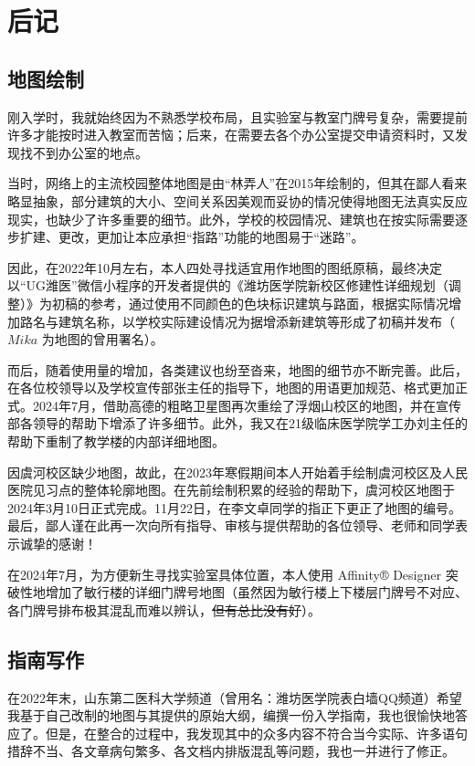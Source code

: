 \chapter[后记]{后记}
\section[地图绘制]{地图绘制}
刚入学时，我就始终因为不熟悉学校布局，且实验室与教室门牌号复杂，需要提前许多才能按时进入教室而苦恼；后来，在需要去各个办公室提交申请资料时，又发现找不到办公室的地点。

当时，网络上的主流校园整体地图是由“林弄人”在2015年绘制的，但其在鄙人看来略显抽象，部分建筑的大小、空间关系因美观而妥协的情况使得地图无法真实反应现实，也缺少了许多重要的细节。此外，学校的校园情况、建筑也在按实际需要逐步扩建、更改，更加让本应承担“指路”功能的地图易于“迷路”。

因此，在2022年10月左右，本人四处寻找适宜用作地图的图纸原稿，最终决定以“UG潍医”微信小程序的开发者提供的《潍坊医学院新校区修建性详细规划（调整）》为初稿的参考，通过使用不同颜色的色块标识建筑与路面，根据实际情况增加路名与建筑名称，以学校实际建设情况为据增添新建筑等形成了初稿并发布（$Mika$ 为地图的曾用署名）。

而后，随着使用量的增加，各类建议也纷至沓来，地图的细节亦不断完善。此后，在各位校领导以及学校宣传部张主任的指导下，地图的用语更加规范、格式更加正式。2024年7月，借助高德的粗略卫星图再次重绘了浮烟山校区的地图，并在宣传部各领导的帮助下增添了许多细节。此外，我又在21级临床医学院学工办刘主任的帮助下重制了教学楼的内部详细地图。

因虞河校区缺少地图，故此，在2023年寒假期间本人开始着手绘制虞河校区及人民医院见习点的整体轮廓地图。在先前绘制积累的经验的帮助下，虞河校区地图于2024年3月10日正式完成。11月22日，在李文卓同学的指正下更正了地图的编号。最后，鄙人谨在此再一次向所有指导、审核与提供帮助的各位领导、老师和同学表示诚挚的感谢！

在2024年7月，为方便新生寻找实验室具体位置，本人使用 Affinity® Designer 突破性地增加了敏行楼的详细门牌号地图（虽然因为敏行楼上下楼层门牌号不对应、各门牌号排布极其混乱而难以辨认，\st{但有总比没有好}）。

\section[指南写作]{指南写作}

在2022年末，山东第二医科大学频道（曾用名：潍坊医学院表白墙QQ频道）希望我基于自己改制的地图与其提供的原始大纲，编撰一份入学指南，我也很愉快地答应了。但是，在整合的过程中，我发现其中的众多内容不符合当今实际、许多语句措辞不当、各文章病句繁多、各文档内排版混乱等问题，我也一并进行了修正。

